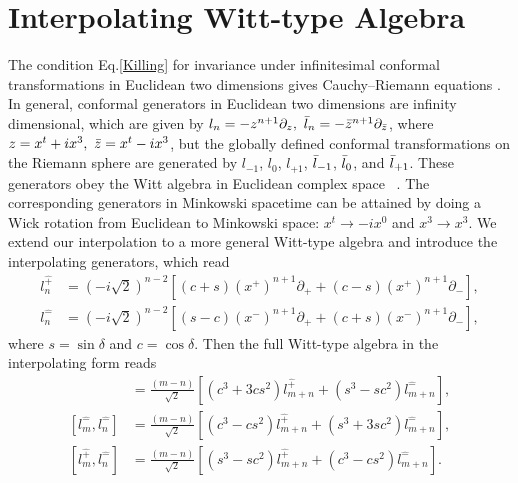 \documentclass[%
 reprint,
superscriptaddress,
 amsmath,amssymb,
 aps,
]{revtex4-2}
\begin{document}
\section{Interpolating  Witt-type Algebra}
\label{sec_Witt-type}
The condition Eq.\eqref{Killing} for invariance under infinitesimal conformal transformations in Euclidean two dimensions gives Cauchy–Riemann equations \cite{Francesco, Blumenhagen}. In general, conformal generators in Euclidean two dimensions are infinity dimensional, which are given by $l_n=-z^{n+1}\partial_{z},~\Bar{l}_n=-\Bar{z}^{n+1}\partial_{\Bar{z}}$, where $z=x^t+ix^3,~ \Bar{z}=x^t-ix^3$, but the globally defined conformal transformations on the Riemann sphere are generated by $l_{-1}$, $l_{0}$, $l_{+1}$, $\Bar{l}_{-1}$, $\Bar{l}_{0}$, and $\Bar{l}_{+1}$. These generators obey the Witt algebra in Euclidean complex space~ \cite{Francesco, Blumenhagen}. The corresponding generators in Minkowski spacetime can be attained by doing a Wick rotation from Euclidean to Minkowski space: $x^t\longrightarrow -ix^{0}$ and $x^3\longrightarrow x^{3}$. We extend our interpolation to a more general Witt-type algebra and introduce the interpolating generators, which read
\begin{align}
    l^{\hat{+}}_n&=(-i\sqrt{2})^{n-2}\left[(c+s)\left(x^{+}\right)^{n+1}\partial_{+}+(c-s)\left(x^{+}\right)^{n+1}\partial_{-}\right],\\
    l^{\hat{-}}_n&=(-i\sqrt{2})^{n-2}\left[(s-c)\left(x^{-}\right)^{n+1}\partial_{+}+(c+s)\left(x^{-}\right)^{n+1}\partial_{-}\right],
\end{align} 
where $s=\sin{\delta}$ and $c=\cos{\delta}$. Then the full Witt-type algebra in the interpolating form reads
\begin{align}
    [l^{\hat{+}}_m,l^{\hat{+}}_n]&=\frac{(m-n)}{\sqrt{2}}[(c^{3}+3cs^{2})l^{\hat{+}}_{m+n}+(s^{3}-sc^{2})l^{\hat{-}}_{m+n}],\\
    [l^{\hat{-}}_m,l^{\hat{-}}_n]&=\frac{(m-n)}{\sqrt{2}}[(c^{3}-cs^{2})l^{\hat{+}}_{m+n}+(s^{3}+3sc^{2})l^{\hat{-}}_{m+n}],\\
    [l^{\hat{+}}_m,l^{\hat{-}}_n]&=\frac{(m-n)}{\sqrt{2}}[(s^{3}-sc^{2})l^{\hat{+}}_{m+n}+(c^{3}-cs^{2})l^{\hat{-}}_{m+n}].
\end{align}
\end{document}
